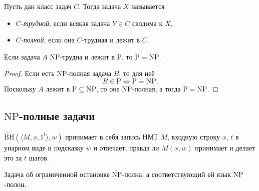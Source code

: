 \documentclass[12pt,a4paper]{article}
\newcommand{\Pclass}{\mathrm{P}}
\newcommand{\NPclass}{\mathrm{NP}}
\newcommand{\NPtilde}{\widetilde{\mathrm{NP}}}
\newcommand{\BHtilde}{\widetilde{\mathrm{BH}}}
\begin{document}
    \begin{definition}
        Пусть дан класс задач $C$. Тогда задача $X$ называется
        \begin{itemize}
            \item \emph{$C$-трудной}, если всякая задача $Y \in C$ сводима к $X$,
            \item \emph{$C$-полной}, если она $C$-трудная и лежит в $C$.
        \end{itemize}
    \end{definition}

    \begin{theorem}
        Если задача $A$ $\NPclass$-трудна и лежит в $\Pclass$, то $\Pclass = \NPclass$.
    \end{theorem}

    \begin{proof}
        Если есть $\NPclass$-полная задача $B$, то для неё
        \[B \in \Pclass \Leftrightarrow \Pclass = \NPclass.\]
        Поскольку $A$ лежит в $\Pclass \subseteq \NPclass$, то она $\NPclass$-полная, а тогда $\Pclass = \NPclass$.
    \end{proof}

    \subsection{$\NPclass$-полные задачи}

    \begin{definition}
        $\BHtilde(\langle M, x, 1^t \rangle, w)$ принимает в себя запись НМТ $M$, входную строку $x$, $t$ в унарном виде и подсказку $w$ и отвечает, правда ли $M(x, w)$ принимает и делает это за $t$ шагов.
    \end{definition}

    \begin{theorem}
        Задача об ограниченной остановке $\NPtilde$-полна, а соответствующий ей язык $\NPclass$-полон.
    \end{theorem}
\end{document}
